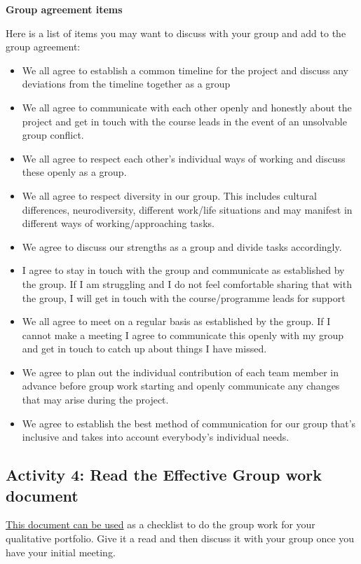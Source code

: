 \documentclass[
  english,
  letterpaper,
  DIV=11,
  numbers=noendperiod]{scrreprt}
\providecommand{\tightlist}{%
  \setlength{\itemsep}{0pt}\setlength{\parskip}{0pt}}
\begin{document}
\textbf{Group agreement items}

Here is a list of items you may want to discuss with your group and add
to the group agreement:

\begin{itemize}
\tightlist
\item
  We all agree to establish a common timeline for the project and
  discuss any deviations from the timeline together as a group
\item
  We all agree to communicate with each other openly and honestly about
  the project and get in touch with the course leads in the event of an
  unsolvable group conflict.
\item
  We all agree to respect each other's individual ways of working and
  discuss these openly as a group.
\item
  We all agree to respect diversity in our group. This includes cultural
  differences, neurodiversity, different work/life situations and may
  manifest in different ways of working/approaching tasks.
\item
  We agree to discuss our strengths as a group and divide tasks
  accordingly.
\item
  I agree to stay in touch with the group and communicate as established
  by the group. If I am struggling and I do not feel comfortable sharing
  that with the group, I will get in touch with the course/programme
  leads for support
\item
  We all agree to meet on a regular basis as established by the group.
  If I cannot make a meeting I agree to communicate this openly with my
  group and get in touch to catch up about things I have missed.
\item
  We agree to plan out the individual contribution of each team member
  in advance before group work starting and openly communicate any
  changes that may arise during the project.
\item
  We agree to establish the best method of communication for our group
  that's inclusive and takes into account everybody's individual needs.
\end{itemize}

\subsection{Activity 4: Read the Effective Group work
document}\label{activity-4-read-the-effective-group-work-document}

\href{https://gla-my.sharepoint.com/:w:/g/personal/ashley_robertson_glasgow_ac_uk/EZCuPb2m-MFMtAIGTAb2eM4B_ateTxqyR5X6YLceaL2Qcg?e=XeHk9h}{This
document can be used} as a checklist to do the group work for your
qualitative portfolio. Give it a read and then discuss it with your
group once you have your initial meeting.
\end{document}
